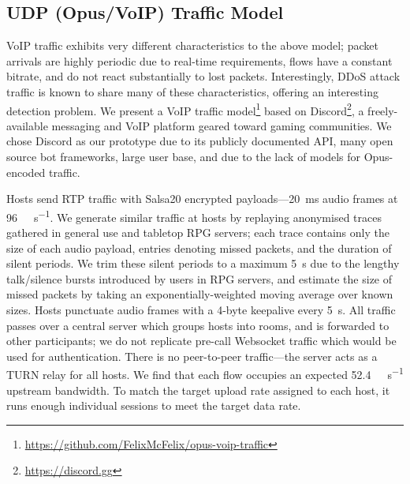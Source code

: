\documentclass[10pt, times, comsoc]{IEEEtran}
\begin{document}
\subsection{UDP (Opus/VoIP) Traffic Model}\label{sec:udp-opus-traffic-model}
VoIP traffic exhibits very different characteristics to the above model; packet arrivals are highly periodic due to real-time requirements, flows have a constant bitrate, and do not react substantially to lost packets.
Interestingly, DDoS attack traffic is known to share many of these characteristics, offering an interesting detection problem.
We present a VoIP traffic model\footnote{\url{https://github.com/FelixMcFelix/opus-voip-traffic}} based on Discord\footnote{\url{https://discord.gg}}, a freely-available messaging and VoIP platform geared toward gaming communities.
We chose Discord as our prototype due to its publicly documented API, many open source bot frameworks, large user base, and due to the lack of models for Opus-encoded traffic.

Hosts send RTP traffic with Salsa20 encrypted payloads---\SI{20}{\milli\second} audio frames at \SI{96}{\kilo\bit\per\second}.
We generate similar traffic at hosts by replaying anonymised traces gathered in general use and tabletop RPG servers; each trace contains only the size of each audio payload, entries denoting missed packets, and the duration of silent periods.
We trim these silent periods to a maximum \SI{5}{\second} due to the lengthy talk/silence bursts introduced by users in RPG servers, and estimate the size of missed packets by taking an exponentially-weighted moving average over known sizes.
Hosts punctuate audio frames with a 4-byte keepalive every \SI{5}{\second}.
All traffic passes over a central server which groups hosts into rooms, and is forwarded to other participants; we do not replicate pre-call Websocket traffic which would be used for authentication.
There is no peer-to-peer traffic---the server acts as a TURN relay for all hosts.
We find that each flow occupies an expected \SI{52.4}{\kilo\bit\per\second} upstream bandwidth.
To match the target upload rate assigned to each host, it runs enough individual sessions to meet the target data rate.

\end{document}

